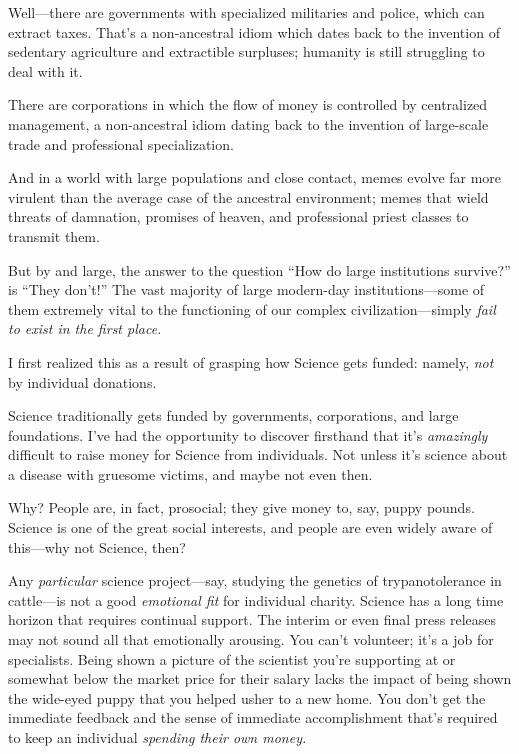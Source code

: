 {
 Well---there are governments with specialized militaries and
police, which can extract taxes. That's a non-ancestral
idiom which dates back to the invention of sedentary agriculture and
extractible surpluses; humanity is still struggling to deal with it.}

{
 There are corporations in which the flow of money is controlled by
centralized management, a non-ancestral idiom dating back to the
invention of large-scale trade and professional specialization.}

{
 And in a world with large populations and close contact, memes
evolve far more virulent than the average case of the ancestral
environment; memes that wield threats of damnation, promises of heaven,
and professional priest classes to transmit them.}

{
 But by and large, the answer to the question
``How do large institutions
survive?'' is ``They
don't!'' The vast majority of large
modern-day institutions---some of them extremely vital to the
functioning of our complex civilization---simply \textit{fail to exist
in the first place.}}

{
 I first realized this as a result of grasping how Science gets
funded: namely, \textit{not} by individual donations.}

{
 Science traditionally gets funded by governments, corporations,
and large foundations. I've had the opportunity to
discover firsthand that it's \textit{amazingly}
difficult to raise money for Science from individuals. Not unless
it's science about a disease with gruesome victims, and
maybe not even then.}

{
 Why? People are, in fact, prosocial; they give money to, say,
puppy pounds. Science is one of the great social interests, and people
are even widely aware of this---why not Science, then?}

{
 Any \textit{particular} science project---say, studying the
genetics of trypanotolerance in cattle---is not a good
\textit{emotional fit} for individual charity. Science has a long time
horizon that requires continual support. The interim or even final
press releases may not sound all that emotionally arousing. You
can't volunteer; it's a job for
specialists. Being shown a picture of the scientist
you're supporting at or somewhat below the market price
for their salary lacks the impact of being shown the wide-eyed puppy
that you helped usher to a new home. You don't get the
immediate feedback and the sense of immediate accomplishment
that's required to keep an individual \textit{spending
their own money.}}

